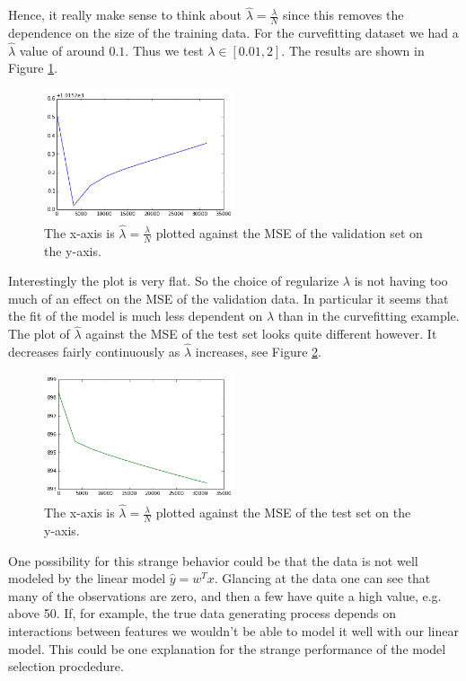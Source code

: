 \documentclass{article}
\begin{document}
%
%
Hence, it really make sense to think about $\hat{\lambda} = \frac{\lambda}{N}$ since this removes the dependence on the size of the training data. For the curvefitting dataset we had a $\hat{\lambda}$ value of around $0.1$. Thus we test $\lambda \in [0.01,2]$. The results are shown in Figure \ref{blog-model-selection}.
%
%
%
\begin{figure}[h]
\centering
\includegraphics[width=0.5\textwidth]{blog-model-selection}
\caption{The x-axis is $\hat{\lambda} = \frac{\lambda}{N}$ plotted against the MSE of the validation set on the y-axis.}
\label{blog-model-selection}
\end{figure}
%
 Interestingly the plot is very flat. So the choice of regularize $\lambda$ is not having too much of an effect on the MSE of the validation data. In particular it seems that the fit of the model is much less dependent on $\lambda$ than in the curvefitting example.  The plot of $\hat{\lambda}$ against the MSE of the test set looks quite different however. It decreases fairly continuously as $\hat{\lambda}$ increases, see Figure \ref{blog-model-select-test}.
\begin{figure}[h]
\centering
\includegraphics[width=0.5\textwidth]{blog-model-select-test}
\caption{The x-axis is $\hat{\lambda} = \frac{\lambda}{N}$ plotted against the MSE of the test set on the y-axis.}
\label{blog-model-select-test}
\end{figure}
  One possibility for this strange behavior could be that the data is not well modeled by the linear model $\hat{y} = w^T x$. Glancing at the data one can see that many of the observations are zero, and then a few have quite a high value, e.g. above 50. If, for example, the true data generating process depends on interactions between features we wouldn't be able to model it well with our linear model. This could be one explanation for the strange performance of the model selection procdedure.
\end{document}

